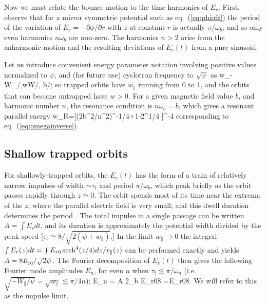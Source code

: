 \documentclass{agujournal2019}
\let\oldequation\equation
\let\oldendequation\endequation
\renewenvironment{equation}
  {\linenomathNonumbers\oldequation}
  {\oldendequation\endlinenomath}
\def\citep{\cite}
\def\wp{w_\parallel}
\def\wr{w_{\parallel R}}
\begin{document}
Now we must relate the bounce motion to the time harmonics of
$E_r$. First, observe that for a mirror symmetric potential such as
eq.\ (\ref{eq:phiofz}) the period of the variation of
$E_r=-\partial \phi/\partial r$ with $z$ at constant $r$ is actually
$\pi/\omega_b$, and so only even harmonics $n\omega_b$ are non-zero.
The harmonics $n>2$ arise from the anharmonic motion and the resulting
deviations of $E_r(t)$ from a pure sinusoid.

Let us introduce convenient energy parameter notation involving
positive values normalized to
$\psi$, and (for future use) cyclotron frequency to $\sqrt\psi$ as
\begin{equation}
  \label{eq:scaledtopsi}
  w_\parallel\equiv-W_\parallel/\psi,\qquad w\equiv W/\psi,
  \qquad b\equiv\Omega/\sqrt\psi;
\end{equation}
so trapped orbits have
$\wp$ running from 0 to 1, and the orbits that can become untrapped
have $w>0$. For a given magnetic field value
$b$, and harmonic number $n$, the resonance condition is $n\omega_b=b$,
which gives a resonant parallel energy 
\begin{equation}
  \label{eq:resen}
  \wr=[(2b^2/n^2)^{-1/4}+1-2^{1/4} ]^{-4} %
\end{equation}
corresponding to eq.\ (\ref{eq:omegainverse}).

\subsection{Shallow trapped orbits}
\label{impulsesec}

For shallowly-trapped orbits, the $E_r(t)$ has the form of a train of
relatively narrow impulses of width $\sim \tau_t$ and period
$\pi/\omega_b$, which peak briefly as the orbit passes rapidly through
$z\simeq 0$. The orbit spends most of its time near the extrema of the
$z$, where the parallel electric field is very small; and this dwell duration
determines the period \citep{Hutchinson2019a}. The total impulse in a single passage can
be written $A=\int E_r dt$, and its duration is approximately the
potential width divided by the peak speed
[$\tau_t\simeq 8/\sqrt{2(\psi+\wp)}$.]  In the limit
$\wp\to 0$ the integral
$\int E_r(z)dt=\int E_{r0}\,{\rm sech}^4(z/4)dz/v_\parallel(z)$ can be
performed exactly and yields $A=8E_{r0}/\sqrt{2\psi}$. The Fourier
decomposition of $E_r(t)$ then gives the following Fourier mode
amplitudes $E_n$, for even $n$ when $\tau_t\lesssim\pi/\omega_n$ (i.e.\
$\sqrt{-W_\parallel/\psi}=\sqrt{\wp}\lesssim\pi/4n$):
\begin{equation}
  \label{eq:fouriermodes}
  E_n = A {2\omega_b\over \pi} \simeq
  E_{r0}{8\over\pi}
  =E_{r0}{8\over\pi}\sqrt{\wp}.
\end{equation}
We will refer to this as the impulse limit.
\end{document}
